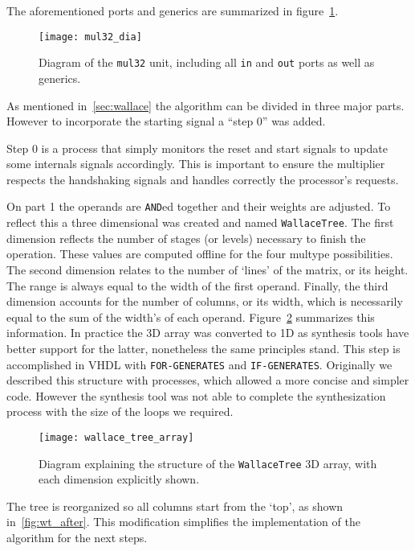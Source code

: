 The aforementioned ports and generics are summarized in figure~\ref{fig:mul32_dia}.

\begin{figure}[H]
\centering
\texttt{[image: mul32\_dia]}
\caption{Diagram of the \texttt{mul32} unit, including all \texttt{in} and \texttt{out} ports as well as generics.}
\label{fig:mul32_dia}
\end{figure}

As mentioned in~\ref{sec:wallace} the algorithm can be divided in three major parts. However to incorporate the starting signal a ``step 0'' was added.

Step 0 is a process that simply monitors the reset and start signals to update some internals signals accordingly. This is important to ensure the multiplier respects the handshaking signals and handles correctly the processor's requests.

On part 1 the operands are \texttt{AND}ed together and their weights are adjusted. To reflect this a three dimensional \STDV was created and named \texttt{WallaceTree}. The first dimension reflects the number of stages (or levels) necessary to finish the operation. These values are computed offline for the four multype possibilities. The second dimension relates to the number of `lines' of the matrix, or its height. The range is always equal to the width of the first operand. Finally, the third dimension accounts for the number of columns, or its width, which is necessarily equal to the sum of the width's of each operand. Figure~\ref{fig:wallace_tree_array} summarizes this information. In practice the 3D array was converted to 1D as synthesis tools have better support for the latter, nonetheless the same principles stand. This step is accomplished in VHDL with \texttt{FOR-GENERATES} and \texttt{IF-GENERATES}. Originally we described this structure with processes, which allowed a more concise and simpler code. However the synthesis tool was not able to complete the synthesization process with the size of the loops we required.

\begin{figure}[H]
\centering
\texttt{[image: wallace\_tree\_array]}
\caption{Diagram explaining the structure of the \texttt{WallaceTree} 3D array, with each dimension explicitly shown.}
\label{fig:wallace_tree_array}
\end{figure}

The tree is reorganized so all columns start from the `top', as shown in~\ref{fig:wt_after}. This modification simplifies the implementation of the algorithm for the next steps.

